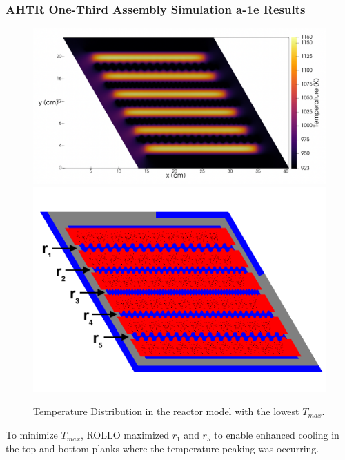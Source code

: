 \begin{frame}
    \frametitle{AHTR One-Third Assembly Simulation a-1e Results}
    \begin{figure}
        \includegraphics[width=0.59\linewidth]{../docs/figures/a-1e-temp-distribution-2d.png} 
        \includegraphics[width=0.4\linewidth]{../docs/figures/coolant-channel-shape-assem.png} 
        \caption{Temperature Distribution in the reactor model with the lowest $T_{max}$.}
    \end{figure}

    To minimize $T_{max}$, ROLLO maximized $r_1$ and $r_5$ to enable enhanced cooling 
    in the top and bottom planks where the temperature peaking was occurring.

\end{frame}

